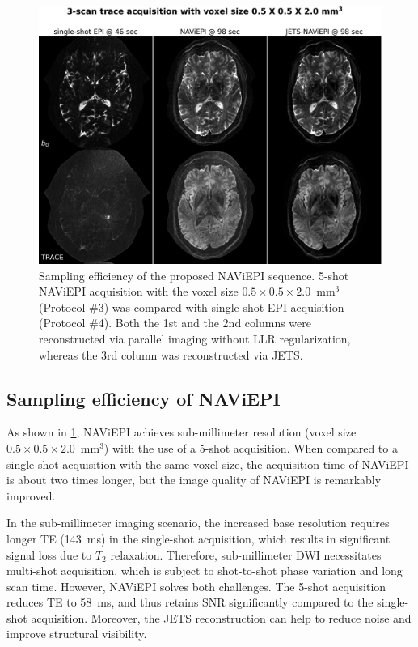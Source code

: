 \documentclass[preprint,12pt,authoryear,review]{elsarticle}
\begin{document}
    \begin{figure}
        \centering
        \includegraphics[width=\textwidth]{../figures/fig7.png}
        \caption{Sampling efficiency of the proposed NAViEPI sequence.
        5-shot NAViEPI acquisition with the voxel size
        $0.5\times0.5\times2.0$~mm$^3$ (Protocol \#3)
        was compared with single-shot EPI acquisition (Protocol \#4).
        Both the 1st and the 2nd columns were reconstructed
        via parallel imaging without LLR regularization,
        whereas the 3rd column was reconstructed via JETS.}
        \label{FIG:0.5mm_shots}
    \end{figure}

    \subsection{Sampling efficiency of NAViEPI}

    As shown in \cref{FIG:0.5mm_shots},
    NAViEPI achieves sub-millimeter resolution
    (voxel size $0.5\times0.5\times2.0$~mm$^3$)
    with the use of a 5-shot acquisition.
    When compared to a single-shot acquisition
    with the same voxel size,
    the acquisition time of NAViEPI is about two times longer,
    but the image quality of NAViEPI is remarkably improved.

    In the sub-millimeter imaging scenario,
    the increased base resolution requires longer TE (\SI{143}{\ms})
    in the single-shot acquisition,
    which results in significant signal loss due to $T_2$ relaxation.
    Therefore, sub-millimeter DWI necessitates multi-shot acquisition,
    which is subject to shot-to-shot phase variation and long scan time.
    However, NAViEPI solves both challenges.
    The 5-shot acquisition reduces TE to \SI{58}{\ms},
    and thus retains SNR significantly
    compared to the single-shot acquisition.
    Moreover, the JETS reconstruction can help to reduce noise
    and improve structural visibility.
\end{document}
